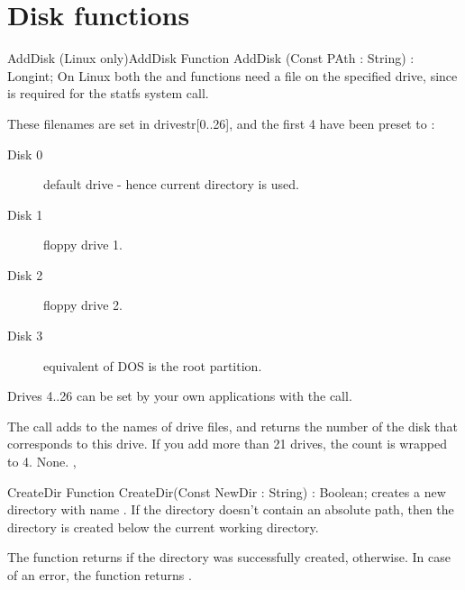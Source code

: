 
 

\section{Disk functions}

\begin{functionl}{AddDisk (Linux only)}{AddDisk}
\Declaration
Function AddDisk (Const PAth : String) : Longint;
\Description
On Linux  both the  and  functions need a 
file on the specified drive, since is required for the statfs system call.

These filenames are set in drivestr[0..26], and the first 4 have been 
preset to :
\begin{description}
\item[Disk 0]   default drive - hence current directory is used.
\item[Disk 1]   floppy drive 1.
\item[Disk 2]   floppy drive 2.
\item[Disk 3]    equivalent of DOS is the root partition.
\end{description}
Drives 4..26 can be set by your own applications with the  call.

The  call adds  to the names of drive files, and
returns the number of the disk that corresponds to this drive. If you
add more than 21 drives, the count is wrapped to 4.
\Errors
None. 
\SeeAlso
{}, 
\end{functionl}

\begin{function}{CreateDir}
\Declaration
Function CreateDir(Const NewDir : String) : Boolean;
\Description
{} creates a new directory with name .
If the directory doesn't contain an absolute path, then the directory is
created below the current working directory.

The function returns  if the directory was successfully 
created,  otherwise.
\Errors
In case of an error, the function returns .
\SeeAlso
{}
\end{function}


